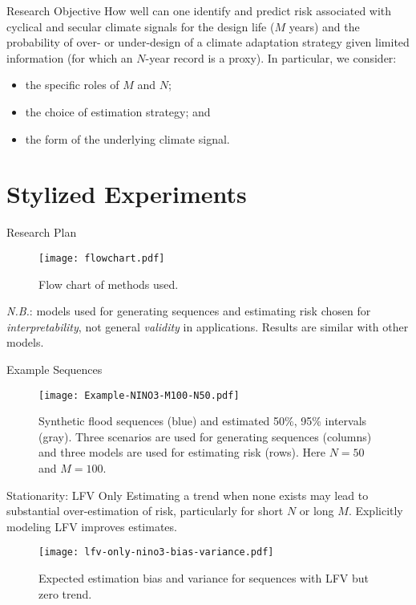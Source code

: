 \documentclass[
  10pt,     %
]{beamer}
\begin{document}
\begin{frame}{Research Objective}
  How well can one identify and predict risk associated with cyclical and secular climate signals for the design life ($M$ years) and the probability of over- or under-design of a climate adaptation strategy given limited information (for which an $N$-year record is a proxy).
  In particular, we consider:
  \begin{itemize}
    \item the specific roles of $M$ and $N$;
    \item the choice of estimation strategy; and
    \item the form of the underlying climate signal.
  \end{itemize}
\end{frame}

\section{Stylized Experiments}

\begin{frame}{Research Plan}
  \begin{figure}
    \centering
    \texttt{[image: flowchart.pdf]}
    \caption{Flow chart of methods used.}
  \end{figure}
  \pause
  \emph{N.B.}: models used for generating sequences and estimating risk chosen for \emph{interpretability}, not general \emph{validity} in applications.
  Results are similar with other models.
\end{frame}

\begin{frame}{Example Sequences}
  \begin{figure}
    \centering
    \texttt{[image: Example-NINO3-M100-N50.pdf]}
    \caption{
      Synthetic flood sequences (blue) and estimated 50\%, 95\% intervals (gray).
      Three scenarios are used for generating sequences (columns) and three models are used for estimating risk (rows).
      Here $N=50$ and $M=100$.
    }
  \end{figure}
\end{frame}

\begin{frame}{Stationarity: LFV Only}
  Estimating a trend when none exists may lead to substantial over-estimation of risk, particularly for short $N$ or long $M$.
  Explicitly modeling LFV improves estimates.
  \begin{figure}
    \centering
    \texttt{[image: lfv-only-nino3-bias-variance.pdf]}
    \caption{
      Expected estimation bias and variance for sequences with LFV but zero trend.
    }\label{fig:lfv-nino3-bias-variance}
  \end{figure}
\end{frame}
\end{document}
